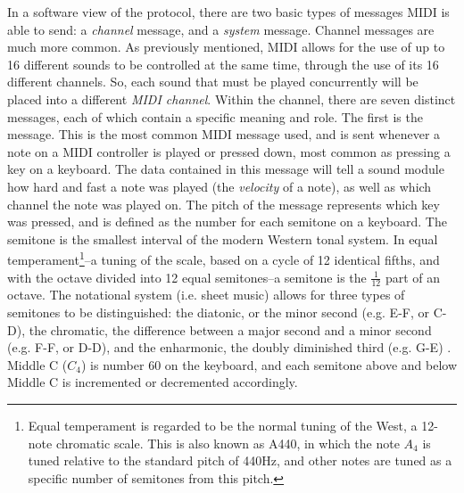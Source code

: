 In a software view of the protocol, there are two basic types of messages MIDI is able to send: a \textit{channel} message, and a \textit{system} message. Channel messages are much more common. As previously mentioned, MIDI allows for the use of up to 16 different sounds to be controlled at the same time, through the use of its 16 different channels. So, each sound that must be played concurrently will be placed into a different \textit{MIDI channel}. Within the channel, there are seven distinct messages, each of which contain a specific meaning and role. The first is the  message. This is the most common MIDI message used, and is sent whenever a note on a MIDI controller is played or pressed down, most common as pressing a key on a keyboard. The data contained in this message will tell a sound module how hard and fast a note was played (the \textit{velocity} of a note), as well as which channel the note was played on\cite{Romano_2003}. The pitch of the message represents which key was pressed, and is defined as the number for each semitone on a keyboard. The semitone is the smallest interval of the modern Western tonal system. In equal temperament\footnote{Equal temperament is regarded to be the normal tuning of the West, a 12-note chromatic scale. This is also known as A440, in which the note $A_4$ is tuned relative to the standard pitch of 440Hz, and other notes are tuned as a specific number of semitones from this pitch.}--a tuning of the scale, based on a cycle of 12 identical fifths, and with the octave divided into 12 equal semitones--a semitone is the $\frac{1}{12}$ part of an octave. The notational system (i.e. sheet music) allows for three types of semitones to be distinguished: the diatonic, or the minor second (e.g. E-F, or C\musSharp{}-D), the chromatic, the difference between a major second and a minor second (e.g. F-F\musSharp{}, or D\musFlat{}-D), and the enharmonic, the doubly diminished third (e.g. G\musFlat{}\musFlat{}-E) \cite{Drabkin_Lindley_2001}. Middle C ($C_4$) is number 60 on the keyboard, and each semitone above and below Middle C is incremented or decremented accordingly\cite{Kirk_Hunt_2013}. 

